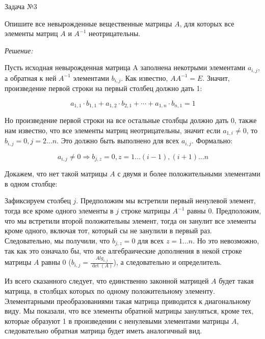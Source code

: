 \documentclass[10pt]{article}
\begin{document}
\hspace{2mm}

Задача №3

Опишите все невырожденные вещественные матрицы $A$, для которых все элементы матриц $A$ и $A^{-1}$ неотрицательны.

\textit{Решение:}

Пусть исходная невырожденная матрица A заполнена некотрыми элементами $a_{i,j}$, а обратная к ней $A^{-1}$ элементами $b_{i, j}$. Как известно, $AA^{-1} = E$. Значит, произведение первой строки на первый столбец должно дать 1:

\[
a_{1,1}\cdot b_{1,1} + a_{1,2}\cdot b_{2,1} + \cdots + a_{1,n}\cdot b_{n,1} = 1 
\]

Но произведение первой строки на все остальные столбцы должно дать 0, также нам известно, что все элементы матриц неотрицательны, значит если $a_{1,i} \neq 0$, то $b_{i,j} = 0, j = 2\ldots n$. Это должно быть выполнено для всех $a_{i,j}$. Формально: 

\[a_{i,j} \neq 0 \Rightarrow b_{j,z} = 0, z = 1\ldots (i-1),(i+1)\ldots n\]

 
 Докажем, что нет такой матрицы $A$ с двумя и более положительными элементами в одном столбце:
 
 \vspace{2mm}
 
 Зафиксируем столбец $j$. Предположим мы встретили первый ненулевой элемент, тогда все кроме одного элементы в $j$ строке матрицы $A^{-1}$ равны 0. Предположим, что мы встретили второй положительны элемент, тогда он занулит все элементы кроме одного, включая тот, который сы не занулили в первый раз. Следовательно, мы получили, что $b_{j,z} = 0$ для всех $z = 1\ldots n$.
 Но это невозможно, так как это означало бы, что все алгебраические дополнения в некой строке матрицы $A$ равны 0 ($b_{i,j} = \frac{Alg_{i,j}}{\det(A)}$), а следовательно и определитель. 

Из всего сказанного следует, что единственно законной матрицей $A$ будет такая матрица, в столбцах которых по одному положительному элементу. Элементарными преобразованиями такая матрица приводится к диагональному виду. Мы показали, что все элементы обратной матрицы зануляться, кроме тех, которые образуют 1 в произведении с ненулевыми элементами матрицы $A$, следовательно обратная матрица будет иметь аналогичный вид. 
\end{document}
